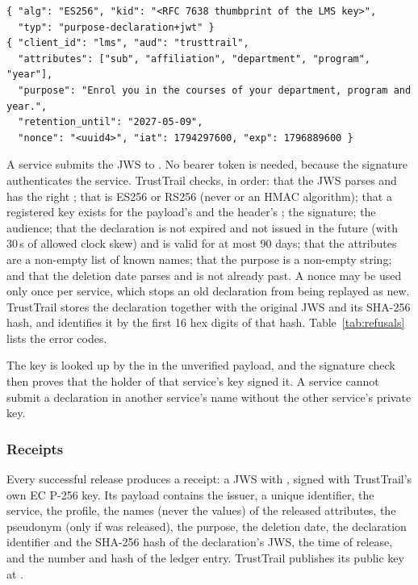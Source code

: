 \begin{lstlisting}[caption={Header and payload of a purpose declaration (LMS)}, label={lst:declaration}]
{ "alg": "ES256", "kid": "<RFC 7638 thumbprint of the LMS key>",
  "typ": "purpose-declaration+jwt" }
{ "client_id": "lms", "aud": "trusttrail",
  "attributes": ["sub", "affiliation", "department", "program", "year"],
  "purpose": "Enrol you in the courses of your department, program and year.",
  "retention_until": "2027-05-09",
  "nonce": "<uuid4>", "iat": 1794297600, "exp": 1796889600 }
\end{lstlisting}

A service submits the JWS to . No bearer token is needed, because the signature authenticates the service. TrustTrail checks, in order: that the JWS parses and has the right ; that  is ES256 or RS256 (never  or an HMAC algorithm); that a registered key exists for the payload's  and the header's ; the signature; the audience; that the declaration is not expired and not issued in the future (with 30\,s of allowed clock skew) and is valid for at most 90 days; that the attributes are a non-empty list of known names; that the purpose is a non-empty string; and that the deletion date parses and is not already past. A nonce may be used only once per service, which stops an old declaration from being replayed as new. TrustTrail stores the declaration together with the original JWS and its SHA-256 hash, and identifies it by the first 16 hex digits of that hash. Table~\ref{tab:refusals} lists the error codes.

The key is looked up by the  in the unverified payload, and the signature check then proves that the holder of that service's key signed it. A service cannot submit a declaration in another service's name without the other service's private key.

\subsubsection{Receipts}
Every successful release produces a receipt: a JWS with  , signed with TrustTrail's own EC P-256 key. Its payload contains the issuer, a unique identifier, the service, the profile, the names (never the values) of the released attributes, the pseudonym (only if  was released), the purpose, the deletion date, the declaration identifier and the SHA-256 hash of the declaration's JWS, the time of release, and the number and hash of the ledger entry. TrustTrail publishes its public key at .


